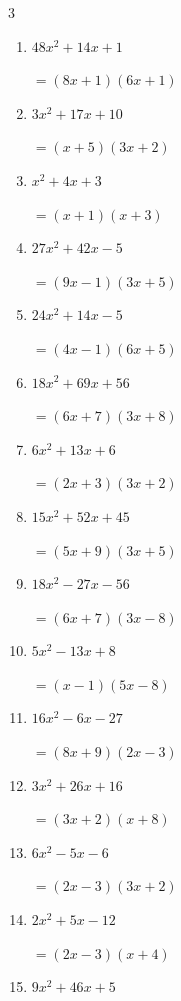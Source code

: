 \begin{multicols}{3}
\begin{enumerate}
\columnbreak %

\resetques

  \item $48x^{2}+14x+1$

        $=(8x+1)(6x+1)$

  \item $3x^{2}+17x+10$

        $=(x+5)(3x+2)$

  \item $x^{2}+4x+3$

        $=(x+1)(x+3)$

  \item $27x^{2}+42x-5$

        $=(9x-1)(3x+5)$

  \item $24x^{2}+14x-5$

        $=(4x-1)(6x+5)$

  \item $18x^{2}+69x+56$

        $=(6x+7)(3x+8)$

  \item $6x^{2}+13x+6$

        $=(2x+3)(3x+2)$

  \item $15x^{2}+52x+45$

        $=(5x+9)(3x+5)$

  \item $18x^{2}-27x-56$

        $=(6x+7)(3x-8)$

  \item $5x^{2}-13x+8$

        $=(x-1)(5x-8)$

\columnbreak %

  \item $16x^{2}-6x-27$

        $=(8x+9)(2x-3)$

  \item $3x^{2}+26x+16$

        $=(3x+2)(x+8)$

  \item $6x^{2}-5x-6$

        $=(2x-3)(3x+2)$

  \item $2x^{2}+5x-12$

        $=(2x-3)(x+4)$

  \item $9x^{2}+46x+5$


\end{enumerate}
\end{multicols}
